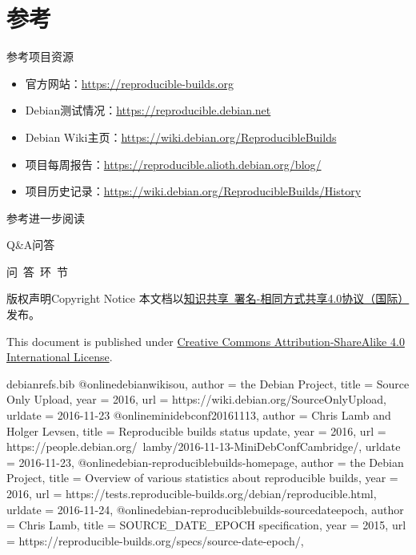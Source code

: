 \documentclass{beamer}
\begin{document}
\section*{参考}
\begin{frame}[t]{参考}{项目资源}
\begin{itemize}
\item 官方网站：\url{https://reproducible-builds.org}
\item Debian测试情况：\url{https://reproducible.debian.net}
\item Debian Wiki主页：\url{https://wiki.debian.org/ReproducibleBuilds}
\item 项目每周报告：\url{https://reproducible.alioth.debian.org/blog/}
\item 项目历史记录：\url{https://wiki.debian.org/ReproducibleBuilds/History}
\end{itemize}
\end{frame}
\begin{frame}{参考}{进一步阅读}
\nocite{*}
\printbibliography
\end{frame}

\begin{frame}{Q\&A}{问答}
\begin{center}
{\Large 问~答~环~节}
\end{center}
\end{frame}

\begin{frame}{版权声明}{Copyright Notice}
本文档以\href{https://creativecommons.org/licenses/by-sa/4.0/legalcode}{知识共享~署名-相同方式共享4.0协议（国际）}发布。
\vspace{1em}

This document is published under \href{https://creativecommons.org/licenses/by-sa/4.0/legalcode}{Creative Commons Attribution-ShareAlike 4.0 International License}.
\end{frame}

\begin{filecontents*}{debianrefs.bib}
@online{debianwikisou,
  author = {the Debian Project},
  title = {Source Only Upload},
  year = 2016,
  url = {https://wiki.debian.org/SourceOnlyUpload},
  urldate = {2016-11-23}
}
@online{minidebconf20161113,
  author = {Chris Lamb and
            Holger Levsen},
  title = {Reproducible builds status update},
  year = 2016,
  url = {https://people.debian.org/~lamby/2016-11-13-MiniDebConfCambridge/},
  urldate = {2016-11-23},
}
@online{debian-reproduciblebuilds-homepage,
  author = {the Debian Project},
  title = {Overview of various statistics about reproducible builds},
  year = 2016,
  url = {https://tests.reproducible-builds.org/debian/reproducible.html},
  urldate = {2016-11-24},
}
@online{debian-reproduciblebuilds-sourcedateepoch,
  author = {Chris Lamb},
  title = {SOURCE\_DATE\_EPOCH specification},
  year = 2015,
  url = {https://reproducible-builds.org/specs/source-date-epoch/},
}
\end{filecontents*}

\end{document}
